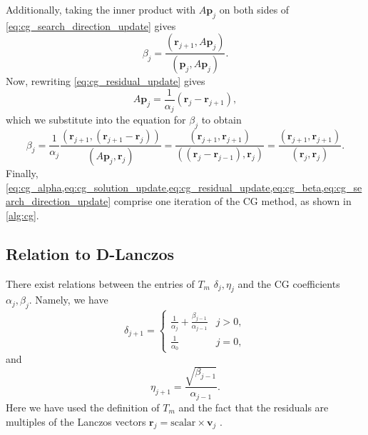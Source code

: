 Additionally, taking the inner product with $A \mathbf{p}_j$ on both sides of \cref{eq:cg_search_direction_update} gives
\[
  \beta_j = \frac{(\mathbf{r}_{j+1}, A \mathbf{p}_j)}{(\mathbf{p}_j, A \mathbf{p}_j)}.
\]
Now, rewriting \cref{eq:cg_residual_update} gives
\[
  A \mathbf{p}_j = \frac{1}{\alpha_j} (\mathbf{r}_j - \mathbf{r}_{j+1}),
\]
which we substitute into the equation for $\beta_j$ to obtain
\begin{equation}
  \beta_j = \frac{1}{\alpha_j}\frac{(\mathbf{r}_{j+1}, (\mathbf{r}_{j+1}-\mathbf{r}_j))}{(A \mathbf{p}_j, \mathbf{r}_j)} = \frac{(\mathbf{r}_{j+1},\mathbf{r}_{j+1})}{((\mathbf{r}_j - \mathbf{r}_{j-1}), \mathbf{r}_j)} = \frac{(\mathbf{r}_{j+1},\mathbf{r}_{j+1})}{(\mathbf{r}_j, \mathbf{r}_j)}.
  \label{eq:cg_beta}
\end{equation}
Finally, \cref{eq:cg_alpha,eq:cg_solution_update,eq:cg_residual_update,eq:cg_beta,eq:cg_search_direction_update} comprise one iteration of the CG method, as shown in \cref{alg:cg}.

\subsection{Relation to D-Lanczos}
There exist relations between the entries of $T_m$ $\delta_j, \eta_j$ and the CG coefficients $\alpha_j, \beta_j$. Namely, we have
\begin{equation}
  \delta_{j+1} =
  \begin{cases}
    \frac{1}{\alpha_j} + \frac{\beta_{j-1}}{\alpha_{j-1}} & j > 0, \\
    \frac{1}{\alpha_0}                                    & j = 0,
  \end{cases}
  \label{eq:cg_lanczos_delta}
\end{equation}
and
\begin{equation}
  \eta_{j+1} = \frac{\sqrt{\beta_{j-1}}}{\alpha_{j-1}}.
  \label{eq:cg_lanczos_eta}
\end{equation}
Here we have used the definition of $T_m$ and the fact that the residuals are multiples of the Lanczos vectors $\mathbf{r}_j = \text{scalar} \times \mathbf{v}_j$ \cite[Equation 6.103]{iter_method_saad}.

